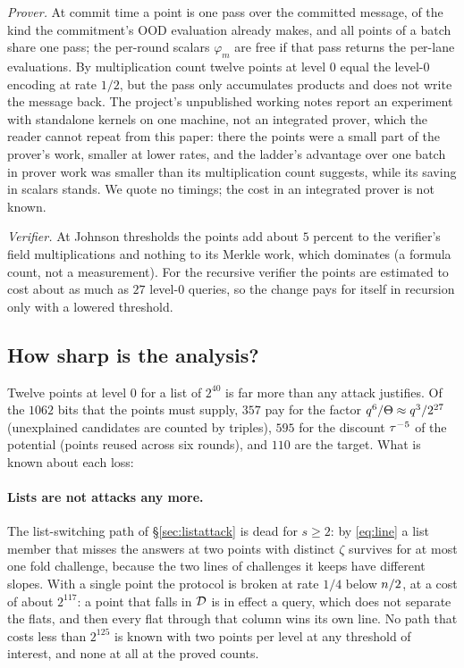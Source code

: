 \emph{Prover.} At commit time a point is one pass over the committed message, of the kind the commitment's OOD evaluation already makes, and all points of a batch share one pass; the per-round scalars $\varphi_m$ are free if that pass returns the per-lane evaluations. By multiplication count twelve points at level $0$ equal the level-$0$ encoding at rate $1/2$, but the pass only accumulates products and does not write the message back. The project's unpublished working notes report an experiment with standalone kernels on one machine, not an integrated prover, which the reader cannot repeat from this paper: there the points were a small part of the prover's work, smaller at lower rates, and the ladder's advantage over one batch in prover work was smaller than its multiplication count suggests, while its saving in scalars stands. We quote no timings; the cost in an integrated prover is not known.

\emph{Verifier.} At Johnson thresholds the points add about $5$ percent to the verifier's field multiplications and nothing to its Merkle work, which dominates (a formula count, not a measurement). For the recursive verifier the points are estimated to cost about as much as $27$ level-$0$ queries, so the change pays for itself in recursion only with a lowered threshold.

\subsection{How sharp is the analysis?}\label{sec:sharp}

Twelve points at level $0$ for a list of $2^{40}$ is far more than any attack justifies. Of the $1062$ bits that the points must supply, $357$ pay for the factor $q^6/\Theta\approx q^3/2^{27}$ (unexplained candidates are counted by triples), $595$ for the discount $\tau^{-5}$ of the potential (points reused across six rounds), and $110$ are the target. What is known about each loss:

\paragraph{Lists are not attacks any more.} The list-switching path of \S\ref{sec:listattack} is dead for $s\ge2$: by \eqref{eq:line} a list member that misses the answers at two points with distinct $\zeta$ survives for at most one fold challenge, because the two lines of challenges it keeps have different slopes. With a single point the protocol is broken at rate $1/4$ below $n/2$, at a cost of about $2^{117}$: a point that falls in $\mathcal{D}$ is in effect a query, which does not separate the flats, and then every flat through that column wins its own line. No path that costs less than $2^{125}$ is known with two points per level at any threshold of interest, and none at all at the proved counts.

